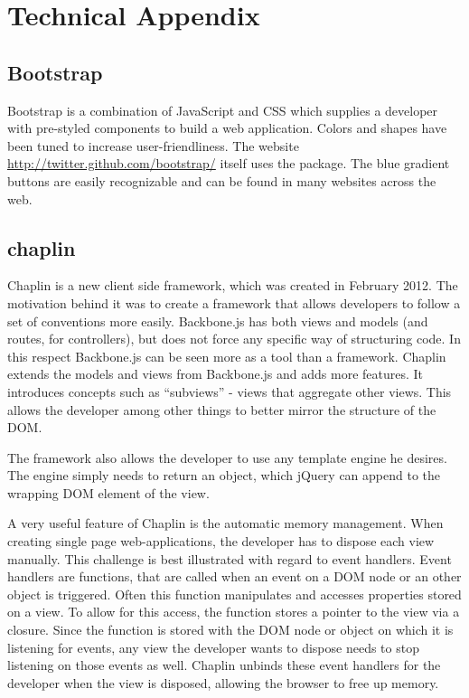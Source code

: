 \documentclass[thesis.tex]{subfiles}
\begin{document}
\appendix
\chapter{Technical Appendix}


\section{Bootstrap}
\label{sec:bootstrap}
Bootstrap is a combination of JavaScript and CSS which supplies a developer
with pre-styled components to build a web application. Colors and shapes
have been tuned to increase user-friendliness.
The website \url{http://twitter.github.com/bootstrap/} itself uses the package.
The blue gradient buttons are easily recognizable and can be found in many
websites across the web.

\section{chaplin}
\label{sec:chaplin}

Chaplin is a new client side framework, which was created in February 2012.
The motivation behind it was to create a framework that allows developers to
follow a set of conventions more easily. Backbone.js has both views and models
(and routes, for controllers), but does not force any specific way of
structuring code. In this respect Backbone.js can be seen more as a tool than a
framework.
Chaplin extends the models and views from Backbone.js and adds more features.
It introduces concepts such as ``subviews'' - views that aggregate other views.
This allows the developer among other things to better mirror the structure of
the DOM.

The framework also allows the developer to use any template engine he desires.
The engine simply needs to return an object, which jQuery can append to the
wrapping DOM element of the view.

A very useful feature of Chaplin is the automatic memory management.
When creating single page web-applications, the developer has to dispose each
view manually. This challenge is best illustrated with regard to event handlers.
Event handlers are functions, that are called when an event on a DOM node or
an other object is triggered. Often this function manipulates and accesses
properties stored on a view. To allow for this access, the function stores a
pointer to the view via a closure. Since the function is stored with the
DOM node or object on which it is listening for events, any view the developer
wants to dispose needs to stop listening on those events as well.
Chaplin unbinds these event handlers for the developer when the view is
disposed, allowing the browser to free up memory.
\end{document}
